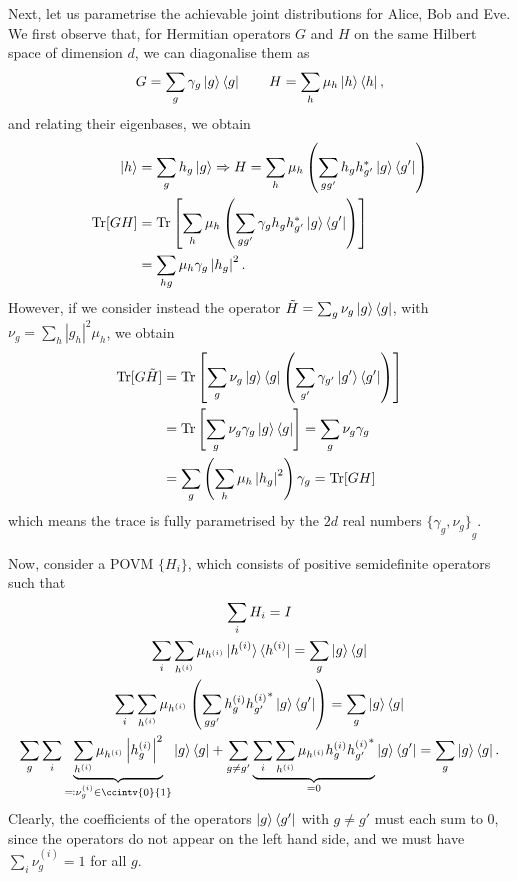 \documentclass[10pt, a4paper]{article}
\numberwithin{equation}{section} %
\theoremstyle{definition}
\theoremstyle{plain}
\newcommand{\abs}[1]{\left\lvert#1\right\rvert}
\newcommand{\?}{\mathrel{?}} %
\newcommand{\Tr}{\mathrm{Tr}} %
\begin{document}
    Next, let us parametrise the achievable joint distributions for Alice, Bob and Eve. We first observe that, for Hermitian operators \(G\) and \(H\) on the same Hilbert space of dimension \(d\), we can diagonalise them as
    \[ G = \sum_g \gamma_g \ket{g}\bra{g} \qquad H = \sum_h \mu_h \ket{h}\bra{h}, \]
    and relating their eigenbases, we obtain
    \begin{align*}
      \ket{h} &= \sum_g h_g \ket{g} \Rightarrow H = \sum_h \mu_h \left(\sum_{gg'} h_g h_{g'}^* \ket{g}\bra{g'}\right) \\
      \Tr[GH] &= \Tr\left[ \sum_h \mu_h \left( \sum_{gg'} \gamma_g h_g h_{g'}^* \ket{g}\bra{g'} \right) \right] \\
      &= \sum_{hg} \mu_h \gamma_g \abs{h_g}^2.
    \end{align*}
    However, if we consider instead the operator \(\tilde{H} = \sum_g \nu_{g} \ket{g}\bra{g}\), with \(\nu_{g} = \sum_h \abs{g_h}^2 \mu_h\), we obtain
    \begin{align*}
      \Tr[G\tilde{H}] &= \Tr\left[ \sum_g \nu_{g} \ket{g}\bra{g} \left(\sum_{g'} \gamma_{g'} \ket{g'}\bra{g'} \right) \right] \\
      &= \Tr\left[ \sum_{g} \nu_{g}\gamma_{g}\ket{g}\bra{g} \right] = \sum_{g} \nu_{g}\gamma_{g} \\
      &= \sum_{g} \left(\sum_{h} \mu_h \abs{h_g}^2\right) \gamma_{g} = \Tr[GH]
    \end{align*}
    which means the trace is fully parametrised by the \(2d\) real numbers \({\{\gamma_g, \nu_{g}\}}_{g}\).

    Now, consider a POVM \(\{H_i\}\), which consists of positive semidefinite operators such that
    \begin{gather*}
      \sum_i H_i = I \\
      \sum_i \sum_{h^{(i)}} \mu_{h^{(i)}} \ket{h^{(i)}}\bra{h^{(i)}} = \sum_g \ket{g}\bra{g} \\
      \sum_i \sum_{h^{(i)}} \mu_{h^{(i)}} \left(\sum_{gg'} h^{(i)}_g {h^{(i)}_{g'}}^* \ket{g}\bra{g'}\right) = \sum_g \ket{g}\bra{g} \\
      \sum_{g} \sum_i \underbrace{\sum_{h^{(i)}} \mu_{h^{(i)}} \abs{h^{(i)}_g}^2}_{\eqqcolon \nu_g^{(i)} \in \ccintv{0}{1}} \ket{g}\bra{g} + \sum_{g \neq g'} \underbrace{ \sum_i \sum_{h^{(i)}} \mu_{h^{(i)}} h^{(i)}_g {h^{(i)}_{g'}}^* }_{=0} \ket{g}\bra{g'} = \sum_g \ket{g}\bra{g}.
    \end{gather*}
    Clearly, the coefficients of the operators \(\ket{g}\bra{g'}\) with \(g \neq g'\) must each sum to 0, since the operators do not appear on the left hand side, and we must have \(\sum_i \nu_g^{(i)} = 1\) for all \(g\).
\end{document}

